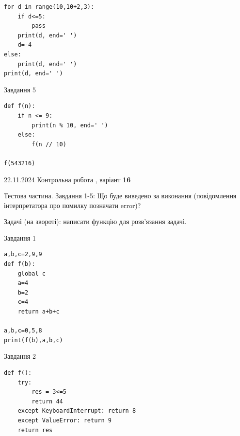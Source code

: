 \documentclass[12pt, ukrainian]{article}
\begin{document}
{{{{{{{{{{{{{{{\begin{minipage}[t]{10.7cm}
\begin{verbatim}
for d in range(10,10+2,3):
    if d<=5:
        pass
    print(d, end=' ')
    d=-4
else:
    print(d, end=' ')
print(d, end=' ')
\end{verbatim}


\vspace{5mm}
               
{\begin{center}Завдання {5}\end{center}}
\vspace{-6mm}

\begin{verbatim}
def f(n):
    if n <= 9:
        print(n % 10, end=' ')
    else:
        f(n // 10)

f(543216)
\end{verbatim}


\end{minipage}

\newpage

{{22.11.2024 Контрольна робота , варіант  \No \textbf { 16 }\par}}
{

Тестова частина. Завдання 1-5: Що буде виведено за виконання (повідомлення інтерпретатора про помилку позначати error)?

Задачі (на звороті): написати функцію для розв'язання задачі.

\vspace{5mm} \begin{minipage}[t]{8.5cm}
               
{\begin{center}Завдання {1}\end{center}}
\vspace{-6mm}

\begin{verbatim}
a,b,c=2,9,9
def f(b):
    global c
    a=4
    b=2
    c=4
    return a+b+c

a,b,c=0,5,8
print(f(b),a,b,c)
\end{verbatim}


\vspace{5mm}
               
{\begin{center}Завдання {2}\end{center}}
\vspace{-6mm}

\begin{verbatim}
def f():
    try:
        res = 3<=5
        return 44
    except KeyboardInterrupt: return 8
    except ValueError: return 9
    return res


\end{verbatim}
\end{minipage}}}}}}}}}}}}}}}}}
\end{document}
